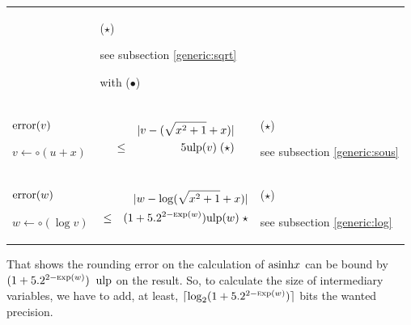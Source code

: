 \documentclass[12pt]{amsart}
\def\n{\textnormal}
\def\ulp{{\rm ulp}}
\def\Exp{{\rm \textsc exp}}
\begin{document}
\begin{center}
\begin{tabular}{l l l}
\begin{minipage}{7.5cm}
\end{minipage} &
\begin{minipage}{6cm}

($\star$)

see subsection \ref{generic:sqrt}

with ($\bullet$)

\end{minipage}\\%
\begin{minipage}{2.5cm}
${\textnormal{error}}(v)$


$v \leftarrow \circ(u+x) $


\end{minipage} &
\begin{minipage}{7.5cm}

\begin{eqnarray}\nonumber
  &&|v-(\sqrt{x^2+1}+x)| \\\nonumber
  &       \leq& 5 \ulp(v) \;(\star)
\end{eqnarray}


\end{minipage} &
\begin{minipage}{6cm}

($\star$)

see subsection \ref{generic:sous}

\end{minipage}\\%
\begin{minipage}{2.5cm}
${\textnormal{error}}(w)$


$w \leftarrow \circ(\log v) $
\end{minipage} &
\begin{minipage}{7.5cm}

\begin{eqnarray}\nonumber
  &&|w-\log(\sqrt{x^2+1}+x)| \\\nonumber
  &       \leq& (1+5.2^{2-\Exp(w)}) \ulp(w) \;\star
\end{eqnarray}


\end{minipage} &
\begin{minipage}{6cm}

($\star$)

see subsection \ref{generic:log}

\end{minipage}
\end{tabular}
\end{center}

That shows the rounding error on the calculation of $\n{asinh} x$ can
be bound by $ (1+5.2^{2-\Exp(w)})\;\; \ulp$ on the result. So, to
calculate the size of intermediary variables, we have to add, at
least, $\lceil \log_2 (1+5.2^{2-\Exp(w)}) \rceil$ bits the wanted
precision.
\end{document}
